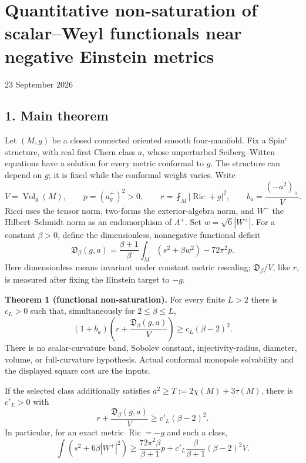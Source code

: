 \documentclass[
  11pt,
]{article}
\author{}
\date{23 September 2026}
\begin{document}
\hypertarget{quantitative-non-saturation-of-scalarweyl-functionals-near-negative-einstein-metrics}{%
\section{Quantitative non-saturation of scalar--Weyl functionals near
negative Einstein
metrics}\label{quantitative-non-saturation-of-scalarweyl-functionals-near-negative-einstein-metrics}}

23 September 2026

\hypertarget{main-theorem}{%
\subsection{1. Main theorem}\label{main-theorem}}

Let \((M,g)\) be a closed connected oriented smooth four-manifold. Fix a
Spin\(^c\) structure, with real first Chern class \(a\), whose
unperturbed Seiberg--Witten equations have a solution for every metric
conformal to \(g\). The structure can depend on \(g\); it is fixed while
the conformal weight varies. Write \[
V=\operatorname{Vol}_g(M),\qquad p=(a_g^+)^2>0,\qquad
r=\fint_M|\operatorname{Ric}+g|^2,\qquad
b_a=\frac{(-a^2)_+}{V}.
\] Ricci uses the tensor norm, two-forms the exterior-algebra norm, and
\(W^+\) the Hilbert--Schmidt norm as an endomorphism of \(\Lambda^+\).
Set \(w=\sqrt6|W^+|\). For a constant \(\beta>0\), define the
dimensionless, nonnegative functional deficit \[
\mathfrak D_\beta(g,a)
=\frac{\beta+1}{\beta}\int_M(s^2+\beta w^2)
-72\pi^2p.
\tag{1}
\] Here dimensionless means invariant under constant metric rescaling;
\(\mathfrak D_\beta/V\), like \(r\), is measured after fixing the
Einstein target to \(-g\).

\textbf{Theorem 1 (functional non-saturation).} For every finite \(L>2\)
there is \(c_L>0\) such that, simultaneously for \(2\le\beta\le L\), \[
\boxed{
(1+b_a)\left(r+\frac{\mathfrak D_\beta(g,a)}V\right)
\ge c_L(\beta-2)^2.
}
\tag{2}
\] There is no scalar-curvature band, Sobolev constant,
injectivity-radius, diameter, volume, or full-curvature hypothesis.
Actual conformal monopole solvability and the displayed square cost are
the inputs.

If the selected class additionally satisfies
\(a^2\ge T:=2\chi(M)+3\tau(M)\), there is \(c'_L>0\) with \[
\boxed{
r+\frac{\mathfrak D_\beta(g,a)}V\ge c'_L(\beta-2)^2.
}
\tag{3}
\] In particular, for an exact metric \(\operatorname{Ric}=-g\) and such
a class, \[
\int(s^2+6\beta|W^+|^2)
\ge\frac{72\pi^2\beta}{\beta+1}p
+c'_L\frac{\beta}{\beta+1}(\beta-2)^2V.
\tag{4}
\]
\end{document}
